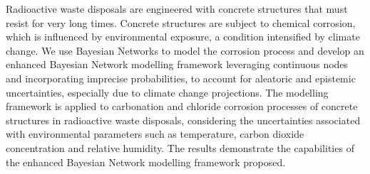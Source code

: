 Radioactive waste disposals are engineered with concrete structures that must resist for very long times. 
Concrete structures are subject to chemical corrosion, which is influenced by environmental exposure, a condition intensified by climate change.
We use Bayesian Networks to model the corrosion process and develop an enhanced Bayesian Network modelling framework leveraging continuous nodes and incorporating imprecise probabilities, to account for aleatoric and epistemic uncertainties, especially due to climate change projections. 
The modelling framework is applied to carbonation and chloride corrosion processes of concrete structures in radioactive waste disposals, considering the uncertainties associated with environmental parameters such as temperature, carbon dioxide concentration and relative humidity.
The results demonstrate the capabilities of the enhanced Bayesian Network modelling framework proposed.